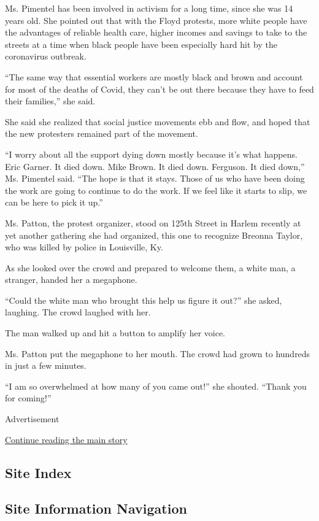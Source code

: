 Ms. Pimentel has been involved in activism for a long time, since she
was 14 years old. She pointed out that with the Floyd protests, more
white people have the advantages of reliable health care, higher incomes
and savings to take to the streets at a time when black people have been
especially hard hit by the coronavirus outbreak.

``The same way that essential workers are mostly black and brown and
account for most of the deaths of Covid, they can't be out there because
they have to feed their families,'' she said.

She said she realized that social justice movements ebb and flow, and
hoped that the new protesters remained part of the movement.

``I worry about all the support dying down mostly because it's what
happens. Eric Garner. It died down. Mike Brown. It died down. Ferguson.
It died down,'' Ms. Pimentel said. ``The hope is that it stays. Those of
us who have been doing the work are going to continue to do the work. If
we feel like it starts to slip, we can be here to pick it up.''

Ms. Patton, the protest organizer, stood on 125th Street in Harlem
recently at yet another gathering she had organized, this one to
recognize Breonna Taylor, who was killed by police in Louisville, Ky.

As she looked over the crowd and prepared to welcome them, a white man,
a stranger, handed her a megaphone.

``Could the white man who brought this help us figure it out?'' she
asked, laughing. The crowd laughed with her.

The man walked up and hit a button to amplify her voice.

Ms. Patton put the megaphone to her mouth. The crowd had grown to
hundreds in just a few minutes.

``I am so overwhelmed at how many of you came out!'' she shouted.
``Thank you for coming!''

Advertisement

\protect\hyperlink{after-bottom}{Continue reading the main story}

\hypertarget{site-index}{%
\subsection{Site Index}\label{site-index}}

\hypertarget{site-information-navigation}{%
\subsection{Site Information
Navigation}\label{site-information-navigation}}

